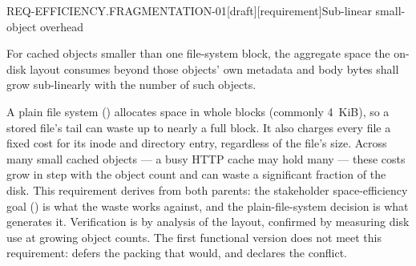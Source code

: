 \begin{requirement}{REQ-EFFICIENCY.FRAGMENTATION-01}[draft][requirement]{Sub-linear small-object overhead}


  For cached objects smaller than one file-system block, the aggregate space
  the on-disk layout consumes beyond those objects' own metadata and body
  bytes shall grow sub-linearly with the number of such objects.

  A plain file system () allocates space
  in whole blocks (commonly 4~KiB), so a stored file's tail can waste up to
  nearly a full block. It also charges every file a fixed cost for its inode
  and directory entry, regardless of the file's size. Across many small
  cached objects --- a busy HTTP cache may hold many --- these costs grow in
  step with the object count and can waste a significant fraction of the
  disk. This requirement derives from both parents: the stakeholder
  space-efficiency goal () is what the waste
  works against, and the plain-file-system decision is what generates it.
  Verification is by analysis of the layout, confirmed by measuring disk use
  at growing object counts. The first functional version does not meet this
  requirement:  defers the packing that
  would, and declares the conflict.



\end{requirement}

